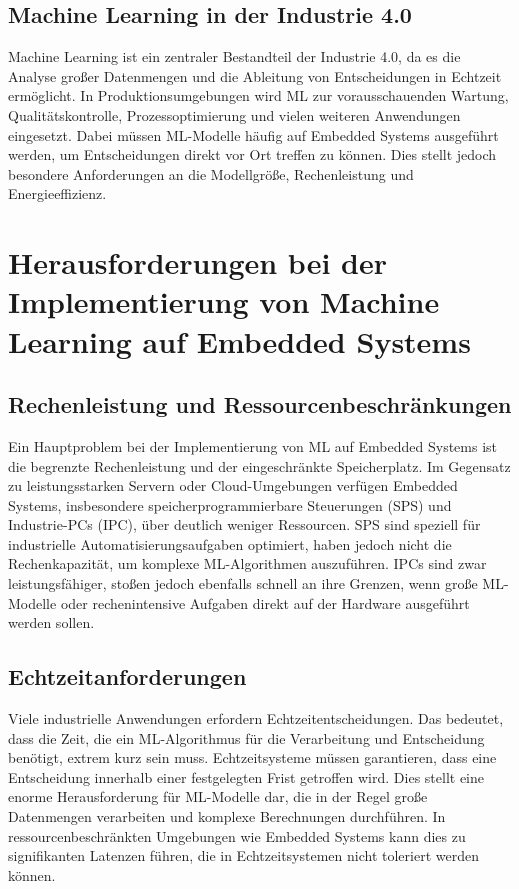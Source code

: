 \subsection{Machine Learning in der Industrie 4.0}

Machine Learning ist ein zentraler Bestandteil der Industrie 4.0, da es die Analyse großer Datenmengen und die Ableitung von Entscheidungen in Echtzeit ermöglicht. In Produktionsumgebungen wird ML zur vorausschauenden Wartung, Qualitätskontrolle, Prozessoptimierung und vielen weiteren Anwendungen eingesetzt. Dabei müssen ML-Modelle häufig auf Embedded Systems ausgeführt werden, um Entscheidungen direkt vor Ort treffen zu können. Dies stellt jedoch besondere Anforderungen an die Modellgröße, Rechenleistung und Energieeffizienz.

\section{Herausforderungen bei der Implementierung von Machine Learning auf Embedded Systems}

\subsection{Rechenleistung und Ressourcenbeschränkungen}

Ein Hauptproblem bei der Implementierung von ML auf Embedded Systems ist die begrenzte Rechenleistung und der eingeschränkte Speicherplatz. Im Gegensatz zu leistungsstarken Servern oder Cloud-Umgebungen verfügen Embedded Systems, insbesondere speicherprogrammierbare Steuerungen (SPS) und Industrie-PCs (IPC), über deutlich weniger Ressourcen. SPS sind speziell für industrielle Automatisierungsaufgaben optimiert, haben jedoch nicht die Rechenkapazität, um komplexe ML-Algorithmen auszuführen. IPCs sind zwar leistungsfähiger, stoßen jedoch ebenfalls schnell an ihre Grenzen, wenn große ML-Modelle oder rechenintensive Aufgaben direkt auf der Hardware ausgeführt werden sollen.

\subsection{Echtzeitanforderungen}

Viele industrielle Anwendungen erfordern Echtzeitentscheidungen. Das bedeutet, dass die Zeit, die ein ML-Algorithmus für die Verarbeitung und Entscheidung benötigt, extrem kurz sein muss. Echtzeitsysteme müssen garantieren, dass eine Entscheidung innerhalb einer festgelegten Frist getroffen wird. Dies stellt eine enorme Herausforderung für ML-Modelle dar, die in der Regel große Datenmengen verarbeiten und komplexe Berechnungen durchführen. In ressourcenbeschränkten Umgebungen wie Embedded Systems kann dies zu signifikanten Latenzen führen, die in Echtzeitsystemen nicht toleriert werden können.

